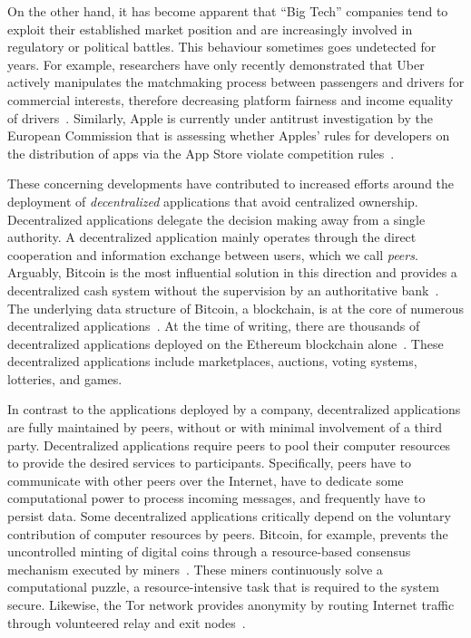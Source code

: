 On the other hand, it has become apparent that \enquote{Big Tech} companies tend to exploit their established market position and are increasingly involved in regulatory or political battles.
This behaviour sometimes goes undetected for years.
For example, researchers have only recently demonstrated that Uber actively manipulates the matchmaking process between passengers and drivers for commercial interests, therefore decreasing platform fairness and income equality of drivers~\cite{bokanyi2019ride}.
Similarly, Apple is currently under antitrust investigation by the European Commission that is assessing whether Apples' rules for developers on the distribution of apps via the App Store violate competition rules~\cite{kotapati2020antitrust}.

These concerning developments have contributed to increased efforts around the deployment of \emph{decentralized} applications that avoid centralized ownership.
Decentralized applications delegate the decision making away from a single authority.
A decentralized application mainly operates through the direct cooperation and information exchange between users, which we call \emph{peers}.
Arguably, Bitcoin is the most influential solution in this direction and provides a decentralized cash system without the supervision by an authoritative bank~\cite{nakamoto2019bitcoin}.
The underlying data structure of Bitcoin, a blockchain, is at the core of numerous decentralized applications~\cite{bashir2018mastering}.
At the time of writing, there are thousands of decentralized applications deployed on the Ethereum blockchain alone~\cite{wood2014ethereum}.
These decentralized applications include marketplaces, auctions, voting systems, lotteries, and games.

In contrast to the applications deployed by a company, decentralized applications are fully maintained by peers, without or with minimal involvement of a third party.
Decentralized applications require peers to pool their computer resources to provide the desired services to participants.
Specifically, peers have to communicate with other peers over the Internet, have to dedicate some computational power to process incoming messages, and frequently have to persist data.
Some decentralized applications critically depend on the voluntary contribution of computer resources by peers.
Bitcoin, for example, prevents the uncontrolled minting of digital coins through a resource-based consensus mechanism executed by miners~\cite{nakamoto2019bitcoin}.
These miners continuously solve a computational puzzle, a resource-intensive task that is required to the system secure.
Likewise, the Tor network provides anonymity by routing Internet traffic through volunteered relay and exit nodes~\cite{dingledine2004tor}.

